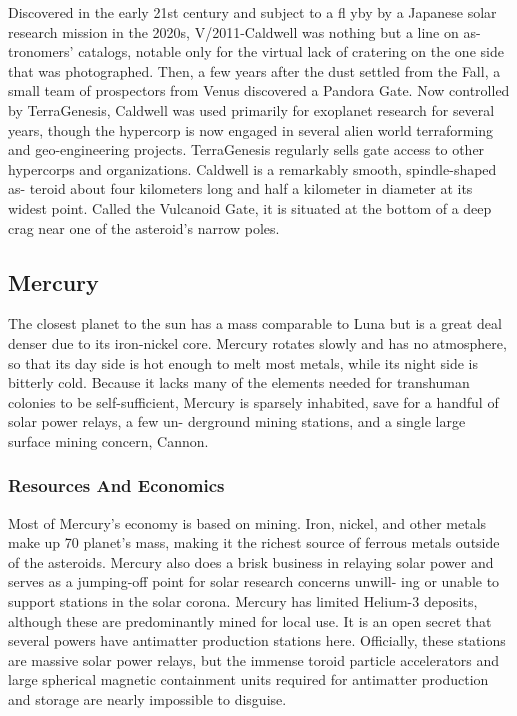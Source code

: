 Discovered in the early 21st century and subject to 
a fl yby by a Japanese solar research mission in the 
2020s, V/2011-Caldwell was nothing but a line on as-
tronomers' catalogs, notable only for the virtual lack 
of cratering on the one side that was photographed. 
Then, a few years after the dust settled from the Fall, 
a small team of prospectors from Venus discovered 
a Pandora Gate. Now controlled by TerraGenesis, 
Caldwell was used primarily for exoplanet research 
for several years, though the hypercorp is now 
engaged in several alien world terraforming and 
geo-engineering projects. TerraGenesis regularly sells 
gate access to other hypercorps and organizations. 
Caldwell is a remarkably smooth, spindle-shaped as-
teroid about four kilometers long and half a kilometer 
in diameter at its widest point. Called the Vulcanoid 
Gate, it is situated at the bottom of a deep crag near 
one of the asteroid's narrow poles.

\subsection{Mercury}

The closest planet to the sun has a mass comparable 
to Luna but is a great deal denser due to its iron-nickel 
core. Mercury rotates slowly and has no atmosphere, 
so that its day side is hot enough to melt most metals, 
while its night side is bitterly cold. Because it lacks 
many of the elements needed for transhuman colonies 
to be self-sufficient, Mercury is sparsely inhabited, 
save for a handful of solar power relays, a few un-
derground mining stations, and a single large surface 
mining concern, Cannon.

\subsubsection{Resources And Economics}

Most of Mercury's economy is based on mining. 
Iron, nickel, and other metals make up 70%
planet's mass, making it the richest source of ferrous 
metals outside of the asteroids. Mercury also does a 
brisk business in relaying solar power and serves as a 
jumping-off point for solar research concerns unwill-
ing or unable to support stations in the solar corona. 
Mercury has limited Helium-3 deposits, although these 
are predominantly mined for local use. It is an open 
secret that several powers have antimatter production 
stations here. Officially, these stations are massive 
solar power relays, but the immense toroid particle 
accelerators and large spherical magnetic containment 
units required for antimatter production and storage 
are nearly impossible to disguise.

